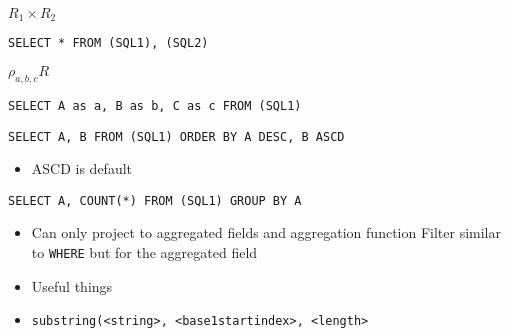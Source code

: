 \begin{itemize}
\begin{itemize}
             $R_1 \times R_2$
\begin{verbatim}
SELECT * FROM (SQL1), (SQL2)
\end{verbatim}
             $\rho_{a, b, c}R$
\begin{verbatim}
SELECT A as a, B as b, C as c FROM (SQL1)
\end{verbatim}
        \end{itemize}
\begin{verbatim}
SELECT A, B FROM (SQL1) ORDER BY A DESC, B ASCD
\end{verbatim}
        \begin{itemize}
            \item ASCD is default
        \end{itemize}
\begin{verbatim}
SELECT A, COUNT(*) FROM (SQL1) GROUP BY A
\end{verbatim}
    \begin{itemize}
        \item Can only project to aggregated fields and aggregation function
             Filter similar to \verb+WHERE+ but for the aggregated field
    \end{itemize}
        \begin{itemize}
            \item Useful things
        \end{itemize}
\end{itemize}

\begin{itemize}
    \item \verb+substring(<string>, <base1startindex>, <length>+
\end{itemize}

